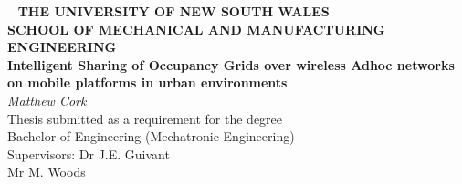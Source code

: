 \begin{center} ~
\textbf{\large THE UNIVERSITY OF NEW SOUTH WALES} \\[1ex]
\textbf{\large SCHOOL OF MECHANICAL AND MANUFACTURING ENGINEERING} \\[2cm]
\textbf{\Huge Intelligent Sharing of Occupancy Grids over wireless Adhoc networks on mobile platforms in urban environments} \\[3cm]
\textit{\huge Matthew Cork} \\[2cm]
{\Large
Thesis submitted as a requirement for the degree\\
Bachelor of Engineering (Mechatronic Engineering) \\[2ex]
Supervisors: Dr J.E. Guivant\\
Mr M. Woods
}
\end{center}
